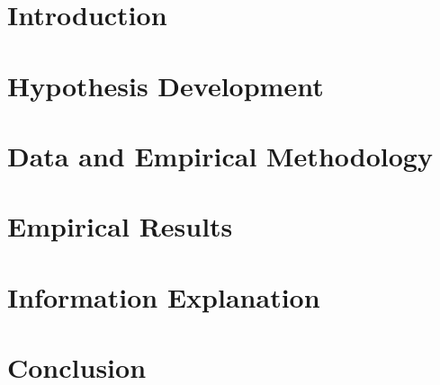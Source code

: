 \documentclass[oneside,12pt]{article}
\begin{document}
\newpage


\newpage


\newpage



\newpage
\tableofcontents
\newpage
\listoftables
\clearpage



\newpage
\fontsize{13pt}{18pt}\selectfont
\section{Introduction}\label{ch:Introduction}



\fontsize{13pt}{18pt}\selectfont
\section{Hypothesis Development}\label{ch:Hypothesis}


\fontsize{13pt}{18pt}\selectfont
\section{Data and Empirical Methodology}\label{ch:method}


\fontsize{13pt}{18pt}\selectfont
\section{Empirical Results}\label{ch:results}



\fontsize{13pt}{18pt}\selectfont
\section{Information Explanation}\label{ch:info}



\fontsize{13pt}{18pt}\selectfont
\section{Conclusion}\label{ch:conclusion}





\newpage
\printbibliography
\end{document}

